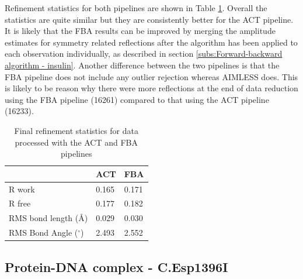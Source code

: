 Refinement statistics for both pipelines are shown in Table \ref{tab:Refinement statistics - insulin}.
Overall the statistics are quite similar but they are consistently better for the ACT pipeline.
It is likely that the FBA results can be improved by merging the amplitude estimates for symmetry related reflections after the algorithm has been applied to each observation individually, as described in section \ref{subs:Forward-backward algorithm - insulin}.
Another difference between the two pipelines is that the FBA pipeline does not include any outlier rejection whereas AIMLESS does.
This is likely to be reason why there were more reflections at the end of data reduction using the FBA pipeline (16261) compared to that using the ACT pipeline (16233).

\begin{table}[ht!]
	\caption{Final refinement statistics for data processed with the ACT and FBA pipelines}
	\centering
	\begin{tabular}{p{4cm} | p{2.5cm} | p{2.5cm}}
		   & ACT & FBA  \\
		\hline
		R work                      & 0.165   & 0.171 \\
		R free                      & 0.177   & 0.182 \\
		RMS bond length (\AA)       & 0.029   & 0.030 \\
        RMS Bond Angle ($^{\circ}$) & 2.493   & 2.552 \\
		\hline
	\end{tabular}
	\label{tab:Refinement statistics - insulin}
\end{table}

\subsection{Protein-DNA complex - C.Esp1396I}
\label{sub:Protein-DNA complex - C.Esp1396I}

